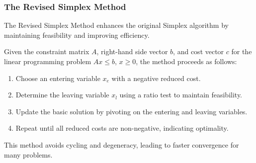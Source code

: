 \documentclass[12pt]{book} %
\begin{document}
\subsubsection{The Revised Simplex Method}
The Revised Simplex Method enhances the original Simplex algorithm by maintaining feasibility and improving efficiency.

Given the constraint matrix \(A\), right-hand side vector \(b\), and cost vector \(c\) for the linear programming problem \(Ax \leq b\), \(x \geq 0\), the method proceeds as follows:

\begin{enumerate}
    \item Choose an entering variable \(x_e\) with a negative reduced cost.
    \item Determine the leaving variable \(x_l\) using a ratio test to maintain feasibility.
    \item Update the basic solution by pivoting on the entering and leaving variables.
    \item Repeat until all reduced costs are non-negative, indicating optimality.
\end{enumerate}

This method avoids cycling and degeneracy, leading to faster convergence for many problems.
\end{document}
